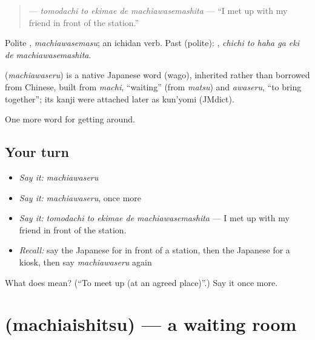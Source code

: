 \begin{quote}
\textbf{  } — \emph{tomodachi to ekimae de machiawasemashita} — \textquotedblleft{}I met up with my friend in front of the station.\textquotedblright{}
\end{quote}

Polite \textbf{}, \emph{machiawasemasu}; an ichidan verb. Past (polite): \textbf{   }, \emph{chichi to haha ga eki de machiawasemashita}.

\begin{cousinweb}
\textbf{} (\emph{machiawaseru}) is a native Japanese word (wago), inherited rather than borrowed from Chinese, built from \emph{machi}, \textquotedblleft{}waiting\textquotedblright{} (from \emph{matsu}) and \emph{awaseru}, \textquotedblleft{}to bring together\textquotedblright{}; its kanji were attached later as kun'yomi (JMdict).
\end{cousinweb}

\begin{grammarlens}[title={What you've built}]
One more word for getting around.
\end{grammarlens}

\subsection*{Your turn}
\begin{itemize}
\raggedright
  \item \emph{Say it:} \emph{machiawaseru}
  \item \emph{Say it:} \emph{machiawaseru}, once more
  \item \emph{Say it:} \emph{tomodachi to ekimae de machiawasemashita} — I met up with my friend in front of the station.
  \item \emph{Recall:} say the Japanese for in front of a station, then the Japanese for a kiosk, then say \emph{machiawaseru} again
\end{itemize}

\begin{tcolorbox}[breakable,colback=teal!4,colframe=teal!35!black,title={Before you move on}]
What does  mean? (\textquotedblleft{}To meet up (at an agreed place)\textquotedblright{}.) Say it once more.
\end{tcolorbox}
\section[\texorpdfstring{\ja{まちあいしつ} (machiaishitsu)}{まちあいしつ (machiaishitsu)}]{ (machiaishitsu) — a waiting room}

